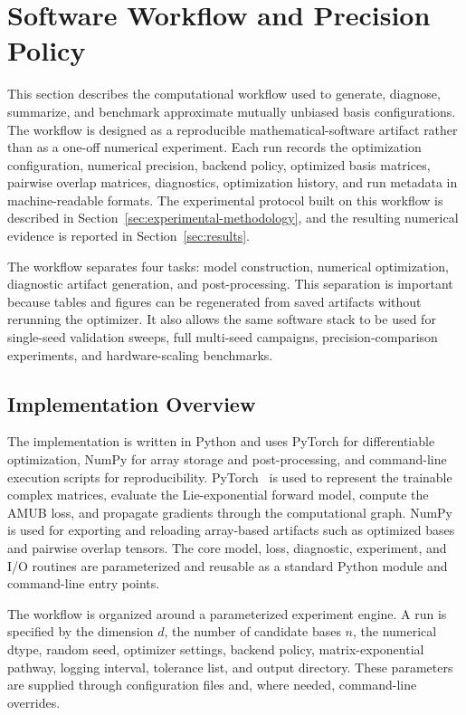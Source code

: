 \documentclass[a4paper,twocolumn,11pt,amsfonts,amssymb]{quantumarticle}
\begin{document}
\section{Software Workflow and Precision Policy}
\label{sec:software-workflow}

This section describes the computational workflow used to generate, diagnose, summarize, and benchmark approximate mutually unbiased basis configurations. The workflow is designed as a reproducible mathematical-software artifact rather than as a one-off numerical experiment. Each run records the optimization configuration, numerical precision, backend policy, optimized basis matrices, pairwise overlap matrices, diagnostics, optimization history, and run metadata in machine-readable formats. The experimental protocol built on this workflow is described in Section~\ref{sec:experimental-methodology}, and the resulting numerical evidence is reported in Section~\ref{sec:results}.

The workflow separates four tasks: model construction, numerical optimization, diagnostic artifact generation, and post-processing. This separation is important because tables and figures can be regenerated from saved artifacts without rerunning the optimizer. It also allows the same software stack to be used for single-seed validation sweeps, full multi-seed campaigns, precision-comparison experiments, and hardware-scaling benchmarks.

\subsection{Implementation Overview}

The implementation is written in Python and uses PyTorch for differentiable optimization, NumPy for array storage and post-processing, and command-line execution scripts for reproducibility. PyTorch~\cite{pytorch2019AnImperativeStyle} is used to represent the trainable complex matrices, evaluate the Lie-exponential forward model, compute the AMUB loss, and propagate gradients through the computational graph. NumPy is used for exporting and reloading array-based artifacts such as optimized bases and pairwise overlap tensors. The core model, loss, diagnostic, experiment, and I/O routines are parameterized and reusable as a standard Python module and command-line entry points.

The workflow is organized around a parameterized experiment engine. A run is specified by the dimension \(d\), the number of candidate bases \(n\), the numerical dtype, random seed, optimizer settings, backend policy, matrix-exponential pathway, logging interval, tolerance list, and output directory. These parameters are supplied through configuration files and, where needed, command-line overrides.
\end{document}
